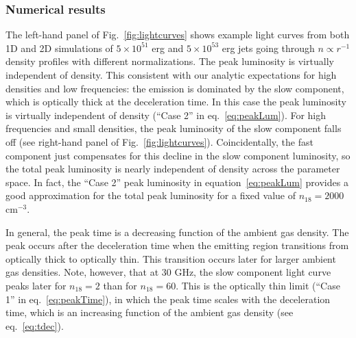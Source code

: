 \documentclass[usenatbib,fleqn]{mnras}
\begin{document}
\subsubsection{Numerical results}
The left-hand panel of Fig.~\ref{fig:lightcurves} shows example light
curves from both 1D and 2D simulations of $5\times 10^{51}$ erg and
$5\times 10^{53}$ erg jets going through $n\propto r^{-1}$ density
profiles with different normalizations. The peak luminosity is
virtually independent of density.  This consistent with our analytic
expectations for high densities and low frequencies: the emission is
dominated by the slow component, which is optically thick at the
deceleration time. In this case the peak luminosity is virtually
independent of density (``Case 2'' in eq.~\ref{eq:peakLum}). For high
frequencies and small densities, the peak luminosity of the slow
component falls off (see right-hand panel of
Fig.~\ref{fig:lightcurves}). Coincidentally, the fast component just
compensates for this decline in the slow component luminosity, so the
total peak luminosity is nearly independent of density across the
parameter space. In fact, the ``Case 2'' peak luminosity in
equation~\ref{eq:peakLum} provides a good approximation for the total
peak luminosity for a fixed value of $n_{18}=2000$ cm$^{-3}$.

In general, the peak time is a decreasing function of the ambient gas
density. The peak occurs after the deceleration time when the emitting
region transitions from optically thick to optically thin. This
transition occurs later for larger ambient gas densities. Note,
however, that at 30 GHz, the slow component light curve peaks later
for $n_{18}=2$ than for $n_{18}=60$. This is the optically thin limit
(``Case 1'' in eq.~\ref{eq:peakTime}), in which the peak time scales
with the deceleration time, which is an increasing function of the
ambient gas density (see eq.~\ref{eq:tdec}).
\end{document}
